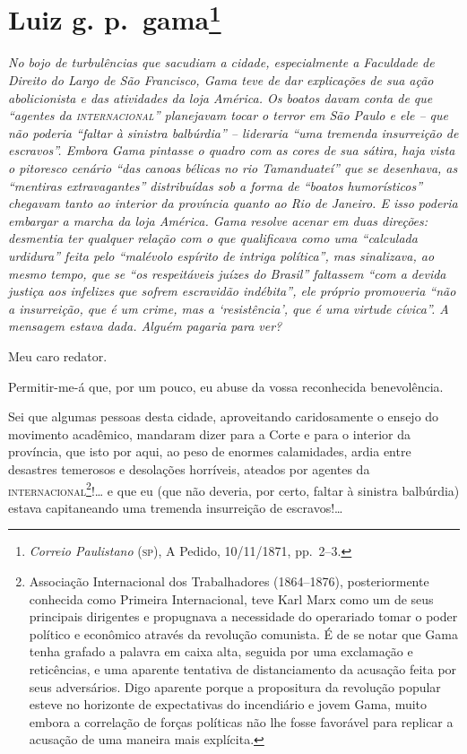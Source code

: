 \chapter{Luiz g. p.~gama\footnote{\emph{Correio Paulistano} (\textsc{sp}), A Pedido, 10/11/1871,
  pp.~2--3.}} %

\begin{didascalia}
\emph{No bojo de turbulências que sacudiam a cidade, especialmente a
Faculdade de Direito do Largo de São Francisco, Gama teve de dar
explicações de sua ação abolicionista e das atividades da loja América.
Os boatos davam conta de que ``agentes da \textsc{internacional}'' planejavam tocar
o terror em São Paulo e ele -- que não poderia ``faltar à sinistra
balbúrdia'' -- lideraria ``uma tremenda insurreição de escravos''. Embora
Gama pintasse o quadro com as cores de sua sátira, haja vista o
pitoresco cenário ``das canoas bélicas no rio Tamanduateí'' que se
desenhava, as ``mentiras extravagantes'' distribuídas sob a forma de
``boatos humorísticos'' chegavam tanto ao interior da província quanto ao
Rio de Janeiro. E isso poderia embargar a marcha da loja América. Gama
resolve acenar em duas direções: desmentia ter qualquer relação com o
que qualificava como uma ``calculada urdidura'' feita pelo ``malévolo
espírito de intriga política'', mas sinalizava, ao mesmo tempo, que se
``os respeitáveis juízes do Brasil'' faltassem ``com a devida justiça aos
infelizes que sofrem escravidão indébita'', ele próprio promoveria ``não a
insurreição, que é um crime, mas a `resistência', que é uma virtude
cívica''. A mensagem estava dada. Alguém pagaria para ver?}
\end{didascalia}


Meu caro redator.

Permitir-me-á que, por um pouco, eu abuse da vossa reconhecida
benevolência.

Sei que algumas pessoas desta cidade, aproveitando caridosamente o
ensejo do movimento acadêmico, mandaram dizer para a Corte e para o
interior da província, que isto por aqui, ao peso de enormes
calamidades, ardia entre desastres temerosos e desolações horríveis,
ateados por agentes da \textsc{internacional}\footnote{ Associação Internacional
  dos Trabalhadores (1864--1876), posteriormente conhecida como Primeira
  Internacional, teve Karl Marx como um de seus principais dirigentes e
  propugnava a necessidade do operariado tomar o poder político e
  econômico através da revolução comunista. É de se notar que Gama tenha
  grafado a palavra em caixa alta, seguida por uma exclamação e
  reticências, e uma aparente tentativa de distanciamento da acusação
  feita por seus adversários. Digo aparente porque a propositura da
  revolução popular esteve no horizonte de expectativas do incendiário e
  jovem Gama, muito embora a correlação de forças políticas não lhe
  fosse favorável para replicar a acusação de uma maneira mais
  explícita.}!\ldots{} e que eu (que não deveria, por certo, faltar à
sinistra balbúrdia) estava capitaneando uma tremenda insurreição de
escravos!\ldots{}

